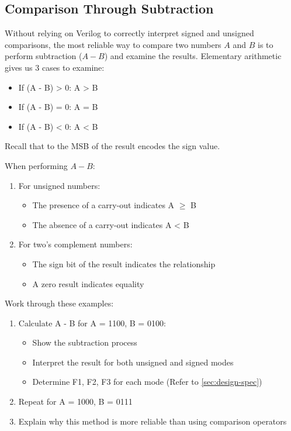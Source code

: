 \documentclass[12pt]{labmanual}
\begin{document}
\subsection{Comparison Through Subtraction}
Without relying on Verilog to correctly interpret signed and unsigned comparisons, the most reliable way to compare two numbers $A$ and  $B$ is to perform subtraction ($A - B$) and examine the results. Elementary arithmetic gives us 3 cases to examine:
\begin{itemize}
    \item If (A - B) > 0: A > B
    \item If (A - B) = 0: A = B
    \item If (A - B) < 0: A < B
\end{itemize}

Recall that to the MSB of the result encodes the sign value.

\begin{important}
When performing $A - B$:
\begin{enumerate}
    \item For unsigned numbers:
    \begin{itemize}
        \item The presence of a carry-out indicates A $\geq$ B
        \item The absence of a carry-out indicates A < B
    \end{itemize}
    \item For two's complement numbers:
    \begin{itemize}
        \item The sign bit of the result indicates the relationship
        \item A zero result indicates equality
    \end{itemize}
\end{enumerate}
\end{important}

\begin{question}
Work through these examples:
\begin{enumerate}
    \item Calculate A - B for A = 1100, B = 0100:
    \begin{itemize}
        \item Show the subtraction process
        \item Interpret the result for both unsigned and signed modes
        \item Determine F1, F2, F3 for each mode (Refer to \autoref{sec:design-spec})
    \end{itemize}
    \item Repeat for A = 1000, B = 0111
    \item Explain why this method is more reliable than using comparison operators
\end{enumerate}
\end{question}
\end{document}
